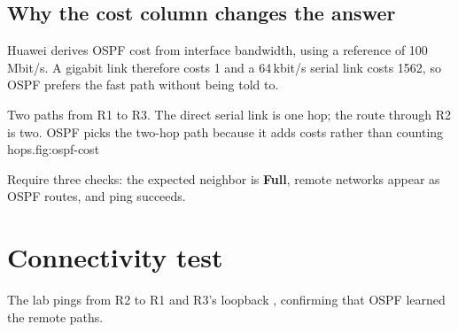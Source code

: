 \subsection{Why the cost column changes the answer}
Huawei derives OSPF cost from interface bandwidth, using a reference of
100\,Mbit/s. A gigabit link therefore costs 1 and a 64\,kbit/s serial
link costs 1562, so OSPF prefers the fast path without being told to.

\begin{utpfig}{Two paths from R1 to R3. The direct serial link
is one hop; the route through R2 is two. OSPF picks the two-hop path because it
adds costs rather than counting hops.}{fig:ospf-cost}
\end{utpfig}

\begin{verification}
Require three checks: the expected neighbor is \textbf{Full}, remote networks appear as OSPF routes, and ping succeeds.
\end{verification}

\section{Connectivity test}
The lab pings from R2 to R1 and R3's loopback , confirming that OSPF learned the remote paths.

